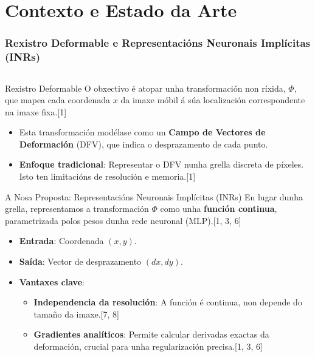 \documentclass[xcolor=dvipsnames]{beamer}
\begin{document}
\section{Contexto e Estado da Arte}

\begin{frame}
    \frametitle{Rexistro Deformable e Representacións Neuronais Implícitas (INRs)}
    
    \begin{columns}
        \begin{column}{0.55\textwidth}
            \begin{block}{Rexistro Deformable}
                O obxectivo é atopar unha transformación non ríxida, $\Phi$, que mapea cada coordenada $x$ da imaxe móbil á súa localización correspondente na imaxe fixa.[1]
                \begin{itemize}
                    \item Esta transformación modélase como un \textbf{Campo de Vectores de Deformación} (DFV), que indica o desprazamento de cada punto.
                    \item \textbf{Enfoque tradicional}: Representar o DFV nunha grella discreta de píxeles. Isto ten limitacións de resolución e memoria.[1]
                \end{itemize}
            \end{block}
            
            \begin{alertblock}{A Nosa Proposta: Representacións Neuronais Implícitas (INRs)}
                En lugar dunha grella, representamos a transformación $\Phi$ como unha \textbf{función continua}, parametrizada polos pesos dunha rede neuronal (MLP).[1, 3, 6]
                \begin{itemize}
                    \item \textbf{Entrada}: Coordenada $(x, y)$.
                    \item \textbf{Saída}: Vector de desprazamento $(dx, dy)$.
                    \item \textbf{Vantaxes clave}:
                    \begin{itemize}
                        \item \textbf{Independencia da resolución}: A función é continua, non depende do tamaño da imaxe.[7, 8]
                        \item \textbf{Gradientes analíticos}: Permite calcular derivadas exactas da deformación, crucial para unha regularización precisa.[1, 3, 6]
                    \end{itemize}
                \end{itemize}
            \end{alertblock}
        \end{column}
        

\end{columns}
\end{frame}
\end{document}
